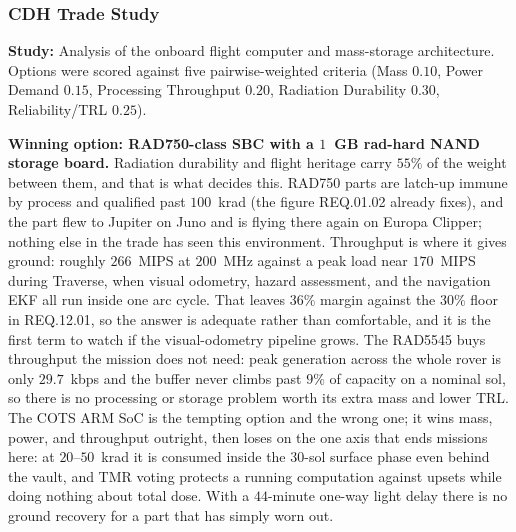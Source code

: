 \documentclass[11pt]{article}
\begin{document}
\subsubsection{CDH Trade Study}
\textbf{Study:} Analysis of the onboard flight computer and mass-storage architecture.
Options were scored against five pairwise-weighted criteria (Mass $0.10$, Power Demand $0.15$,
Processing Throughput $0.20$, Radiation Durability $0.30$, Reliability/TRL $0.25$).

\begin{table}[H]
\centering
\small
{}
\caption{Onboard flight computer and mass-storage architecture trade study.}
\label{tab:cdh-trade}
\end{table}

\textbf{Winning option: RAD750-class SBC with a $1$~GB rad-hard NAND storage board.}
Radiation durability and flight heritage carry $55\%$ of the weight between them, and that is
what decides this. RAD750 parts are latch-up immune by process and qualified past $100$~krad
(the figure REQ.01.02 already fixes), and the part flew to Jupiter on Juno and is flying there
again on Europa Clipper; nothing else in the trade has seen this environment. Throughput is
where it gives ground: roughly $266$~MIPS at $200$~MHz against a peak load near $170$~MIPS during
Traverse, when visual odometry, hazard assessment, and the navigation EKF all run inside one arc
cycle. That leaves $36\%$ margin against the $30\%$ floor in REQ.12.01, so the answer is adequate
rather than comfortable, and it is the first term to watch if the visual-odometry pipeline grows.
The RAD5545 buys throughput the mission does not need: peak generation across the whole rover is
only $29.7$~kbps and the buffer never climbs past $9\%$ of capacity on a nominal sol, so there is
no processing or storage problem worth its extra mass and lower TRL. The COTS ARM SoC is the
tempting option and the wrong one; it wins mass, power, and throughput outright, then loses on
the one axis that ends missions here: at $20$--$50$~krad it is consumed inside the $30$-sol
surface phase even behind the vault, and TMR voting protects a running computation against
upsets while doing nothing about total dose. With a $44$-minute one-way light delay there is no
ground recovery for a part that has simply worn out.
\end{document}
